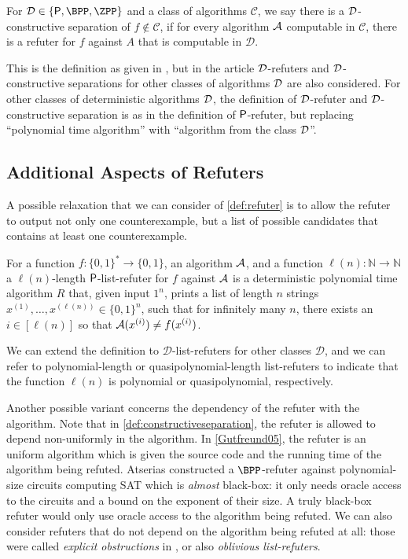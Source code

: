 \begin{definition}
	\label{def:constructiveseparation}
	For $\calD \in \{\PTIME, \BPP, \ZPP\}$ and a class of algorithms $\mathcal{C}$, we say there is a 
	$\mathcal{D}$-constructive separation of $f \not\in \mathcal{C}$, if for every algorithm $\mathcal{A}$ computable
	in $\mathcal{C}$, there is a refuter for $f$ against $A$ that is computable in $\mathcal{D}$. 
\end{definition}

This is the definition as given in \cite[Definition 1.1]{ConstructiveSeparations}, but in the article
$\mathcal{D}$-refuters and $\mathcal{D}$-constructive separations for other classes of algorithms $\mathcal{D}$ are also considered.
For other classes of deterministic algorithms $\mathcal{D}$, the definition of $\mathcal{D}$-refuter and $\mathcal{D}$-constructive 
separation is as in the definition of $\mathsf{P}$-refuter, but replacing ``polynomial time algorithm''
with ``algorithm from the class $\mathcal{D}$''.

\subsection{Additional Aspects of Refuters}

A possible relaxation that we can consider of \cref{def:refuter} is to allow the refuter 
to output not only one counterexample, but a list of possible candidates that contains
at least one counterexample.

\begin{definition}
	For a function $f \colon \{0, 1\}^* \to \{0, 1\}$, an algorithm $\mathcal{A}$,
	and a function $\ell(n) \colon \mathbb{N} \to \mathbb{N}$ 
	a $\ell(n)$-length $\mathsf{P}$-list-refuter for $f$ against $\mathcal{A}$ is a deterministic polynomial time
	algorithm $R$ that, given input $1^n$, prints a list of length $n$ strings
	$x^{(1)}, \ldots, x^{(\ell(n))} \in \{0, 1\}^n$,
	such that for infinitely many $n$, there exists an $i \in [\ell(n)]$ so that 
	$\mathcal{A}(x^{(i)}) \neq f(x^{(i)})$.
\end{definition}

We can extend the definition to $\mathcal{D}$-list-refuters for other classes $\mathcal{D}$,
and we can refer to polynomial-length or quasipolynomial-length list-refuters to indicate that 
the function $\ell(n)$ is polynomial or quasipolynomial, respectively. 

Another possible variant concerns the dependency of the refuter with the algorithm. 
Note that in \cref{def:constructiveseparation}, the refuter is allowed to 
depend non-uniformly in the algorithm. In \cref{Gutfreund05}, the refuter is an uniform
algorithm which is given the source code and the running time of the algorithm being refuted. 
Atserias \cite{Atserias06} constructed a $\BPP$-refuter against polynomial-size circuits 
computing SAT which is \emph{almost} black-box: it only needs oracle access to the circuits
and a bound on the exponent of their size. A truly black-box refuter would only use oracle 
access to the algorithm being refuted. We can also consider refuters that do not depend on the 
algorithm being refuted at all: those were called \emph{explicit obstructions} in \cite{Chen20},
or also \emph{oblivious list-refuters}.

